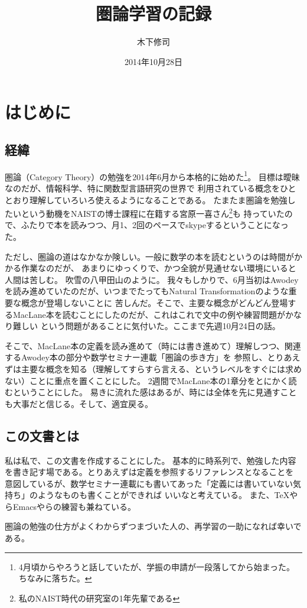 \documentclass{ltjsarticle}
\begin{document}
\title{圏論学習の記録}
\author{木下修司}
\date{2014年10月28日}
\maketitle

\section{はじめに}

\subsection{経緯}

圏論（Category Theory）の勉強を2014年6月から本格的に始めた\footnote{4月頃からやろうと話していたが、学振の申請が一段落してから始まった。ちなみに落ちた。}。
目標は曖昧なのだが、情報科学、特に関数型言語研究の世界で
利用されている概念をひととおり理解していろいろ使えるようになることである。
たまたま圏論を勉強したいという動機をNAISTの博士課程に在籍する宮原一喜さん\footnote{私のNAIST時代の研究室の1年先輩である}も
持っていたので、ふたりで本を読みつつ、月1、2回のペースでskypeするということになった。

ただし、圏論の道はなかなか険しい。一般に数学の本を読むというのは時間がかかる作業なのだが、
あまりにゆっくりで、かつ全貌が見通せない環境にいると人間は苦しむ。
吹雪の八甲田山のように。
我々もしかりで、6月当初はAwodeyを読み進めていたのだが、いつまでたってもNatural Transformationのような重要な概念が登場しないことに
苦しんだ。そこで、主要な概念がどんどん登場するMacLane本を読むことにしたのだが、これはこれで文中の例や練習問題がかなり難しい
という問題があることに気付いた。ここまで先週10月24日の話。

そこで、MacLane本の定義を読み進めて（時には書き進めて）理解しつつ、関連するAwodey本の部分や数学セミナー連載「圏論の歩き方」を
参照し、とりあえずは主要な概念を知る（理解してすらすら言える、というレベルをすぐには求めない）ことに重点を置くことにした。
2週間でMacLane本の1章分をとにかく読むということにした。
易きに流れた感はあるが、時には全体を先に見通すことも大事だと信じる。そして、適宜戻る。

\subsection{この文書とは}

私は私で、この文書を作成することにした。
基本的に時系列で、勉強した内容を書き記す場である。とりあえずは定義を参照するリファレンスとなることを
意図しているが、数学セミナー連載にも書いてあった「定義には書いていない気持ち」のようなものも書くことができれば
いいなと考えている。
また、TeXやらEmacsやらの練習も兼ねている。

圏論の勉強の仕方がよくわからずつまづいた人の、再学習の一助になれば幸いである。
\end{document}
